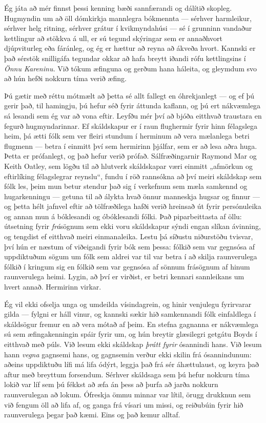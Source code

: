 Ég játa að mér finnst þessi kenning bæði sannfærandi og dálítið skopleg. Hugmyndin um að öll dómkirkja mannlegra bókmennta — sérhver harmleikur, sérhver helg ritning, sérhver grátur í kvikmyndahúsi — sé í grunninn vandaður kettlingur að stökkva á ull, er sú tegund skýringar sem er annaðhvort djúpviturleg eða fáránleg, og ég er hættur að reyna að ákveða hvort. Kannski er það sérstök snilligáfa tegundar okkar að hafa breytt iðandi rófu kettlingsins í \emph{Önnu Kareninu.} Við tókum æfinguna og gerðum hana háleita, og gleymdum svo að hún hefði nokkurn tíma verið æfing.

Þú gætir með réttu mótmælt að þetta sé allt fallegt en óhrekjanlegt — og ef þú gerir það, til hamingju, þú hefur séð fyrir áttunda kaflann, og þú ert nákvæmlega sá lesandi sem ég var að vona eftir. Leyfðu mér því að bjóða eitthvað traustara en fegurð hugmyndarinnar. Ef skáldskapur er í raun flughermir fyrir hinn félagslega heim, þá ætti fólk sem ver fleiri stundum í herminum að vera mælanlega betri flugmenn — betra í einmitt því sem hermirinn þjálfar, sem er að lesa aðra huga. Þetta er prófanlegt, og það hefur verið prófað. Sálfræðingarnir Raymond Mar og Keith Oatley, sem lögðu til að hlutverk skáldskapar væri einmitt „afmörkun og eftirlíking félagslegrar reynslu“, fundu í röð rannsókna að því meiri skáldskap sem fólk les, þeim mun betur stendur það sig í verkefnum sem mæla samkennd og hugarkenningu — getuna til að álykta hvað önnur manneskja hugsar og finnur — og þetta hélt jafnvel eftir að tölfræðilega hafði verið hreinsað út fyrir persónuleika og annan mun á bóklesandi og óbóklesandi fólki. Það piparbeittasta af öllu: útsetning fyrir \emph{frá}sögnum sem ekki voru skáldskapur sýndi engan slíkan ávinning, og tengdist ef eitthvað meiri einmanaleika. Lestu þá síðustu niðurstöðu tvisvar, því hún er næstum of viðeigandi fyrir bók sem þessa: fólkið sem var gegnsósa af uppdiktuðum sögum um fólk sem aldrei var til var betra í að skilja raunverulega fólkið í kringum sig en fólkið sem var gegnsósa af sönnum frásögnum af hinum raunverulega heimi. Lygin, að því er virðist, er betri kennari sannleikans um hvert annað. Hermirinn virkar.

Ég vil ekki ofselja unga og umdeilda vísindagrein, og hinir venjulegu fyrirvarar gilda — fylgni er háll vinur, og kannski sækir hið samkennandi fólk einfaldlega í skáldsögur fremur en að vera mótað af þeim. En stefna gagnanna er nákvæmlega sú sem æfingakenningin spáir fyrir um, og hún breytir glæsilegri getgátu Boyds í eitthvað með púls. Við lesum ekki skáldskap \emph{þrátt fyrir} ósannindi hans. Við lesum hann \emph{vegna} gagnsemi hans, og gagnsemin verður ekki skilin frá ósannindunum: aðeins uppdiktuðu lífi má lifa ódýrt, leggja það frá sér áhættulaust, og keyra það aftur með breyttum forsendum. Sérhver skáldsaga sem þú hefur nokkurn tíma lokið var líf sem þú fékkst að æfa án þess að þurfa að jarða nokkurn raunverulegan að lokum. Ófreskja ömmu minnar var lítil, örugg drukknun sem við fengum öll að lifa af, og ganga frá vísari um missi, og reiðubúin fyrir hið raunverulega þegar það kæmi. Eins og það kemur alltaf.

